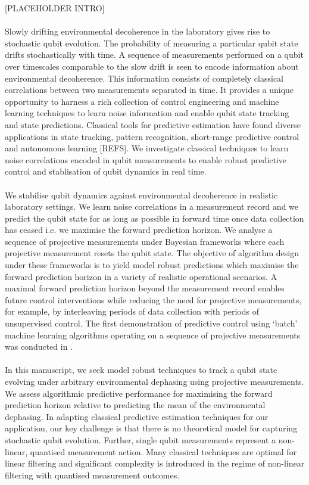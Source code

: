 
[PLACEHOLDER INTRO]
\\
\\
Slowly drifting environmental decoherence in the laboratory gives rise to stochastic qubit evolution. The probability of measuring a particular qubit state drifts stochastically with time. A sequence of measurements performed on a qubit over timescales comparable to the slow drift is seen to encode information about environmental decoherence. This information consists of completely classical correlations between two measurements separated in time.  It provides a unique opportunity to harness a rich collection of control engineering and machine learning techniques to learn noise information and enable qubit state tracking and state predictions. Classical tools for predictive estimation have found diverse applications in state tracking, pattern recognition, short-range predictive control and autonomous learning [REFS]. We investigate classical techniques to learn noise correlations encoded in qubit measurements to enable robust predictive control and stablisation of qubit dynamics in real time. 
\\
\\
We stabilise qubit dynamics against environmental decoherence in realistic laboratory settings. We learn noise correlations in a measurement record and we predict the qubit state for as long as possible in forward time once data collection has ceased i.e. we maximise the forward prediction horizon.  We analyse a sequence of projective measurements under Bayesian frameworks where each projective measurement resets the qubit state. The objective of algorithm design under these frameworks is to yield model robust predictions which maximise the forward prediction horizon in a variety of realistic operational scenarios. A maximal forward prediction horizon beyond the measurement record enables future control interventions while reducing the need for projective measurements, for example, by interleaving periods of data collection with periods of unsupervised control. The first demonstration of predictive control using `batch' machine learning algorithms operating on a sequence of projective measurements was conducted in \cite{mavadia2017}.
\\
\\
In this manuscript, we seek model robust techniques to track a qubit state evolving under arbitrary environmental dephasing using projective measurements. We assess algorithmic predictive performance for maximising the forward prediction horizon relative to predicting the mean of the environmental dephasing. In adapting classical predictive estimation techniques for our application, our key challenge is that there is no theoretical model for capturing stochastic qubit evolution. Further, single qubit measurements represent a non-linear, quantised measurement action.  Many classical techniques are optimal for linear filtering and significant complexity is introduced in the regime of non-linear filtering with quantised measurement outcomes. 
